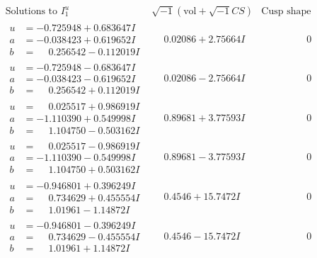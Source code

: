 \documentclass[1p]{elsarticle_modified}
\theoremstyle{definition}
\newcommand{\I}{\sqrt{-1}}
\begin{document}
$$\begin{array}{c|c|c}  
\text{Solutions to }I^u_{1}& \I (\text{vol} + \sqrt{-1}CS) & \text{Cusp shape}\\
 \hline 
\begin{aligned}
u &= -0.725948 + 0.683647 I \\
a &= -0.038423 + 0.619652 I \\
b &= \phantom{-}0.256542 - 0.112019 I\end{aligned}
 & \phantom{-}0.02086 + 2.75664 I & \phantom{-0.000000 } 0 \\ \hline\begin{aligned}
u &= -0.725948 - 0.683647 I \\
a &= -0.038423 - 0.619652 I \\
b &= \phantom{-}0.256542 + 0.112019 I\end{aligned}
 & \phantom{-}0.02086 - 2.75664 I & \phantom{-0.000000 } 0 \\ \hline\begin{aligned}
u &= \phantom{-}0.025517 + 0.986919 I \\
a &= -1.110390 + 0.549998 I \\
b &= \phantom{-}1.104750 - 0.503162 I\end{aligned}
 & \phantom{-}0.89681 + 3.77593 I & \phantom{-0.000000 } 0 \\ \hline\begin{aligned}
u &= \phantom{-}0.025517 - 0.986919 I \\
a &= -1.110390 - 0.549998 I \\
b &= \phantom{-}1.104750 + 0.503162 I\end{aligned}
 & \phantom{-}0.89681 - 3.77593 I & \phantom{-0.000000 } 0 \\ \hline\begin{aligned}
u &= -0.946801 + 0.396249 I \\
a &= \phantom{-}0.734629 + 0.455554 I \\
b &= \phantom{-}1.01961 - 1.14872 I\end{aligned}
 & \phantom{-}0.4546 + 15.7472 I & \phantom{-0.000000 } 0 \\ \hline\begin{aligned}
u &= -0.946801 - 0.396249 I \\
a &= \phantom{-}0.734629 - 0.455554 I \\
b &= \phantom{-}1.01961 + 1.14872 I\end{aligned}
 & \phantom{-}0.4546 - 15.7472 I & \phantom{-0.000000 } 0 \\ \hline\begin{aligned}

\end{aligned}
\end{array}$$
\end{document}
